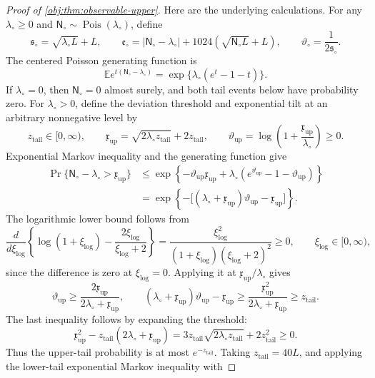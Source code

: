 \documentclass[11pt]{article}
\begin{document}
\begin{proof}[Proof of \cref{obj:thm:observable-upper}]
Here are the underlying calculations. For any
\(\lambda_\circ\ge0\) and
\(\mathsf N_\circ\sim\operatorname{Pois}(\lambda_\circ)\), define
\[
\mathfrak s_\circ=\sqrt{\lambda_\circ L}+L,\qquad
\mathfrak e_\circ
=
|\mathsf N_\circ-\lambda_\circ|
+1024\left(\sqrt{\mathsf N_\circ L}+L\right),
\qquad
\vartheta_\circ=\frac1{2\mathfrak s_\circ}.
\]
The centered Poisson generating function is
\[
\mathbb E e^{t(\mathsf N_\circ-\lambda_\circ)}
=
\exp\{\lambda_\circ(e^t-1-t)\}.
\]
If \(\lambda_\circ=0\), then \(\mathsf N_\circ=0\) almost surely, and both tail events below have probability zero. For \(\lambda_\circ>0\), define the deviation threshold and exponential tilt at an arbitrary nonnegative level by
\[
z_{\mathrm{tail}}\in[0,\infty),\qquad
\mathfrak x_{\mathrm{up}}
=\sqrt{2\lambda_\circ z_{\mathrm{tail}}}+2z_{\mathrm{tail}},
\qquad
\vartheta_{\mathrm{up}}
=\log\left(1+\frac{\mathfrak x_{\mathrm{up}}}{\lambda_\circ}\right)\ge0.
\]
Exponential Markov inequality and the generating function give
\[
\begin{aligned}
\Pr\{\mathsf N_\circ-\lambda_\circ>\mathfrak x_{\mathrm{up}}\}
&\le
\exp\left\{
-\vartheta_{\mathrm{up}}\mathfrak x_{\mathrm{up}}
+\lambda_\circ(e^{\vartheta_{\mathrm{up}}}-1-\vartheta_{\mathrm{up}})
\right\}\\
&=
\exp\left\{
-\bigl[(\lambda_\circ+\mathfrak x_{\mathrm{up}})
\vartheta_{\mathrm{up}}-\mathfrak x_{\mathrm{up}}\bigr]
\right\}.
\end{aligned}
\]
The logarithmic lower bound follows from
\[
\frac{d}{d\xi_{\mathrm{log}}}
\left\{\log(1+\xi_{\mathrm{log}})
-\frac{2\xi_{\mathrm{log}}}{\xi_{\mathrm{log}}+2}\right\}
=
\frac{\xi_{\mathrm{log}}^2}
{(1+\xi_{\mathrm{log}})(\xi_{\mathrm{log}}+2)^2}
\ge0,
\qquad \xi_{\mathrm{log}}\in[0,\infty),
\]
since the difference is zero at \(\xi_{\mathrm{log}}=0\). Applying it at \(\mathfrak x_{\mathrm{up}}/\lambda_\circ\) gives
\[
\vartheta_{\mathrm{up}}
\ge\frac{2\mathfrak x_{\mathrm{up}}}{2\lambda_\circ+\mathfrak x_{\mathrm{up}}},
\qquad
(\lambda_\circ+\mathfrak x_{\mathrm{up}})\vartheta_{\mathrm{up}}
-\mathfrak x_{\mathrm{up}}
\ge
\frac{\mathfrak x_{\mathrm{up}}^2}
{2\lambda_\circ+\mathfrak x_{\mathrm{up}}}
\ge z_{\mathrm{tail}}.
\]
The last inequality follows by expanding the threshold:
\[
\mathfrak x_{\mathrm{up}}^2
-z_{\mathrm{tail}}(2\lambda_\circ+\mathfrak x_{\mathrm{up}})
=
3z_{\mathrm{tail}}\sqrt{2\lambda_\circ z_{\mathrm{tail}}}
+2z_{\mathrm{tail}}^2\ge0.
\]
Thus the upper-tail probability is at most \(e^{-z_{\mathrm{tail}}}\). Taking \(z_{\mathrm{tail}}=40L\), and applying the lower-tail exponential Markov inequality with

\end{proof}
\end{document}
